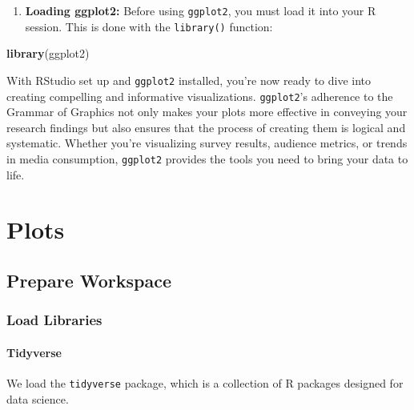 \documentclass[
]{book}
\newenvironment{Shaded}{\begin{snugshade}}{\end{snugshade}}
\newcommand{\FunctionTok}[1]{\textcolor[rgb]{0.13,0.29,0.53}{\textbf{#1}}}
\newcommand{\NormalTok}[1]{#1}
\providecommand{\tightlist}{%
  \setlength{\itemsep}{0pt}\setlength{\parskip}{0pt}}
\begin{document}
\begin{enumerate}
\def\labelenumi{\arabic{enumi}.}
\setcounter{enumi}{1}
\tightlist
\item
  \textbf{Loading ggplot2:} Before using \texttt{ggplot2}, you must load it into your R session. This is done with the \texttt{library()} function:
\end{enumerate}

\begin{Shaded}
\begin{Highlighting}[]
\FunctionTok{library}\NormalTok{(ggplot2)}
\end{Highlighting}
\end{Shaded}

With RStudio set up and \texttt{ggplot2} installed, you're now ready to dive into creating compelling and informative visualizations. \texttt{ggplot2}'s adherence to the Grammar of Graphics not only makes your plots more effective in conveying your research findings but also ensures that the process of creating them is logical and systematic. Whether you're visualizing survey results, audience metrics, or trends in media consumption, \texttt{ggplot2} provides the tools you need to bring your data to life.

\hypertarget{plots}{%
\section{Plots}\label{plots}}

\hypertarget{prepare-workspace}{%
\subsection*{Prepare Workspace}\label{prepare-workspace}}

\hypertarget{load-libraries}{%
\subsubsection*{Load Libraries}\label{load-libraries}}

\hypertarget{tidyverse}{%
\paragraph*{Tidyverse}\label{tidyverse}}

We load the \texttt{tidyverse} package, which is a collection of R packages designed for data science.
\end{document}
